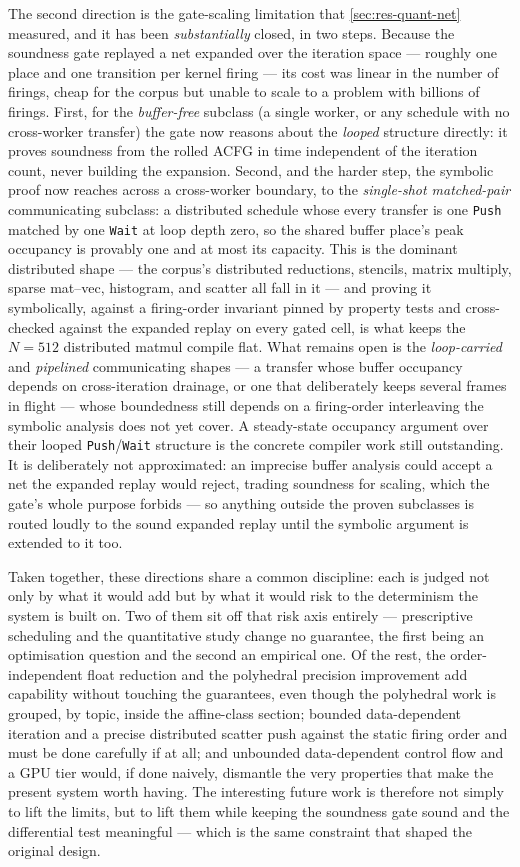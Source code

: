 The second direction is the gate-scaling limitation that \cref{sec:res-quant-net}
measured, and it has been \emph{substantially} closed, in two steps. Because the
soundness gate replayed a net expanded over the iteration space --- roughly one place and
one transition per kernel firing --- its cost was linear in the number of firings, cheap
for the corpus but unable to scale to a problem with billions of firings. First, for the
\emph{buffer-free} subclass (a single worker, or any schedule with no cross-worker
transfer) the gate now reasons about the \emph{looped} structure directly: it proves
soundness from the rolled ACFG in time independent of the iteration count, never building
the expansion. Second, and the harder step, the symbolic proof now reaches across a
cross-worker boundary, to the \emph{single-shot matched-pair} communicating subclass: a
distributed schedule whose every transfer is one \texttt{Push} matched by one
\texttt{Wait} at loop depth zero, so the shared buffer place's peak occupancy is provably
one and at most its capacity. This is the dominant distributed shape --- the corpus's
distributed reductions, stencils, matrix multiply, sparse mat--vec, histogram, and
scatter all fall in it --- and proving it symbolically, against a firing-order invariant
pinned by property tests and cross-checked against the expanded replay on every gated
cell, is what keeps the $N=512$ distributed matmul compile flat. What remains open is the
\emph{loop-carried} and \emph{pipelined} communicating shapes --- a transfer whose buffer
occupancy depends on cross-iteration drainage, or one that deliberately keeps several
frames in flight --- whose boundedness still depends on a firing-order interleaving the
symbolic analysis does not yet cover. A steady-state occupancy argument over their looped
\texttt{Push}/\texttt{Wait} structure is the concrete compiler work still outstanding. It
is deliberately not approximated: an imprecise buffer analysis could accept a net the
expanded replay would reject, trading soundness for scaling, which the gate's whole
purpose forbids --- so anything outside the proven subclasses is routed loudly to the
sound expanded replay until the symbolic argument is extended to it too.

Taken together, these directions share a common discipline: each is judged not only
by what it would add but by what it would risk to the determinism the system is
built on. Two of them sit off that risk axis entirely --- prescriptive scheduling
and the quantitative study change no guarantee, the first being an optimisation
question and the second an empirical one. Of the rest, the order-independent float
reduction and the polyhedral precision improvement add capability without touching
the guarantees, even though the polyhedral work is grouped, by topic, inside the
affine-class section; bounded data-dependent iteration and a precise distributed
scatter push against the static firing order and must be done carefully if at all;
and unbounded data-dependent control flow and a GPU tier would, if done naively,
dismantle the very properties that make the present system worth having. The
interesting future work is therefore not simply to lift the limits, but to lift them
while keeping the soundness gate sound and the differential test meaningful --- which
is the same constraint that shaped the original design.
